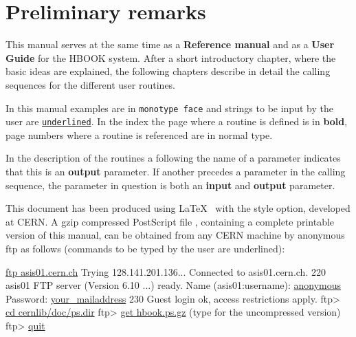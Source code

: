 \section*{Preliminary remarks}
 
This manual serves at the same time as a {\bf Reference manual}
and as a {\bf User Guide} for the HBOOK system.
After a short introductory chapter, where the basic ideas
are explained, the following chapters describe in detail
the calling sequences for the different user routines.
 
In this manual
examples are in {\tt monotype face} and strings to be input by the user 
are {\tt\underline{underlined}}.
In the index the page where a routine is defined is in {\bf bold},
page numbers where a routine is referenced are in normal type.

In the description of the routines a \Lit{*} following
the name of a parameter indicates that this is an {\bf output} parameter.
If another \Lit{*} precedes a parameter in the calling sequence, the
parameter in question is both an {\bf input} and {\bf output} parameter.

This document has been produced using \LaTeX~\cite{bib-LATEX}
with the  style option, developed at CERN. 
A gzip compressed PostScript file ,
containing a complete printable version
of this manual, can be obtained from any CERN machine
by anonymous ftp as follows
(commands to be typed by the user are underlined):

\vspace*{3mm} 
\begin{XMP}
    \underline{ftp asis01.cern.ch}
    Trying 128.141.201.136...
    Connected to asis01.cern.ch.
    220 asis01 FTP server (Version 6.10 ...) ready.
    Name (asis01:username): \underline{anonymous}
    Password: \underline{your\_{}mailaddress}
    230 Guest login ok, access restrictions apply.
    ftp> \underline{cd cernlib/doc/ps.dir}
    ftp> \underline{get hbook.ps.gz}    (type  for the uncompressed version)
    ftp> \underline{quit}
\end{XMP}

\newpage
\tableofcontents
\listoffigures
\listoftables

